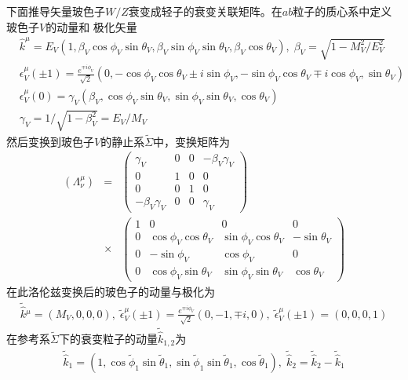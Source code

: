 下面推导矢量玻色子$W/Z$衰变成轻子的衰变关联矩阵。在$ab$粒子的质心系中定义玻色子$V$的动量和
极化矢量
\begin{equation}
\begin{split}
& \hat k^{\mu} = E_V(1,\beta_V\cos\phi_V\sin\theta_V, \beta_V\sin\phi_V\sin\theta_V,\beta_V\cos\theta_V),
\; \beta_V = \sqrt{1-M^2_V/E^2_V} \\
& \epsilon^{\mu}_V(\pm 1) = \frac{e^{\mp i\phi_V}}{\sqrt 2}(0,-\cos\phi_V\cos\theta_V\pm i\sin\phi_V,
-\sin\phi_V\cos\theta_V\mp i\cos\phi_V, \sin\theta_V) \\
& \epsilon^{\mu}_V(0) = \gamma_V(\beta_V, \cos\phi_V\sin\theta_V, \sin\phi_V\sin\theta_V, \cos\theta_V)
\\
& \gamma_V = 1/\sqrt{1-\beta^2_V} = E_V/M_V
\end{split}
\end{equation}
然后变换到玻色子$V$的静止系$\widetilde{\Sigma}$中，变换矩阵为
\begin{eqnarray}
(\Lambda^{\mu}_{\nu}) &=& \left(\begin{array}{cccc}
\gamma_V & 0 & 0 & -\beta_V\gamma_V \\
0 & 1 & 0 & 0 \\
0 & 0 & 1 & 0 \\
-\beta_V\gamma_V & 0 & 0 & \gamma_V
\end{array} \right)
\\
&\times& \left(\begin{array}{cccc}
1 & 0 & 0 & 0 \\
0 & \cos\phi_V\cos\theta_V & \sin\phi_V\cos\theta_V & -\sin\theta_V \\
0 & -\sin\phi_V & \cos\phi_V & 0 \\
0 & \cos\phi_V\sin\theta_V & \sin\phi_V\sin\theta_V & \cos\theta_V
\end{array} \right)
\end{eqnarray}
在此洛伦兹变换后的玻色子的动量与极化为
\begin{eqnarray}
\tilde {\hat k}{}^\mu = (M_V,0,0,0), \; \tilde \epsilon^{\mu}_V(\pm 1) = \frac{e^{\mp i\phi_V}}{\sqrt 2}
(0,-1,\mp i, 0), \; \tilde \epsilon^{\mu}_V(\pm 1) = (0,0,0,1)
\end{eqnarray}
在参考系$\tilde \Sigma$下的衰变粒子的动量$\tilde{\hat{k}}_{1,2}$为
\begin{eqnarray}
\tilde{\hat k}_1 = (1,\cos\tilde{\phi}_1\sin\tilde{\theta}_1, \sin\tilde{\phi}_1\sin\tilde{\theta}_1,
\cos\tilde{\theta}_1), \; \tilde{\hat k}_2 = \tilde{\hat k}_2 - \tilde{\hat k}_1
\end{eqnarray}
